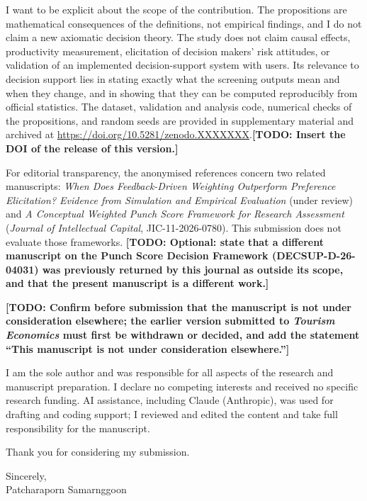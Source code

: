 \documentclass[11pt,a4paper]{article}
\newif\ifdraft \drafttrue
\newcommand{\todo}[1]{\ifdraft{\color{red}\textbf{[TODO: #1]}}\fi}
\newcommand{\RepoDOI}{10.5281/zenodo.XXXXXXX}
\begin{document}
I want to be explicit about the scope of the contribution. The propositions are mathematical consequences of the definitions, not empirical findings, and I do not claim a new axiomatic decision theory. The study does not claim causal effects, productivity measurement, elicitation of decision makers' risk attitudes, or validation of an implemented decision-support system with users. Its relevance to decision support lies in stating exactly what the screening outputs mean and when they change, and in showing that they can be computed reproducibly from official statistics. The dataset, validation and analysis code, numerical checks of the propositions, and random seeds are provided in supplementary material and archived at \url{https://doi.org/\RepoDOI}.\todo{Insert the DOI of the release of this version.}

For editorial transparency, the anonymised references concern two related manuscripts: \emph{When Does Feedback-Driven Weighting Outperform Preference Elicitation? Evidence from Simulation and Empirical Evaluation} (under review) and \emph{A Conceptual Weighted Punch Score Framework for Research Assessment} (\emph{Journal of Intellectual Capital}, JIC-11-2026-0780). This submission does not evaluate those frameworks. \todo{Optional: state that a different manuscript on the Punch Score Decision Framework (DECSUP-D-26-04031) was previously returned by this journal as outside its scope, and that the present manuscript is a different work.}

\todo{Confirm before submission that the manuscript is not under consideration elsewhere; the earlier version submitted to \emph{Tourism Economics} must first be withdrawn or decided, and add the statement ``This manuscript is not under consideration elsewhere.''}

I am the sole author and was responsible for all aspects of the research and manuscript preparation. I declare no competing interests and received no specific research funding. AI assistance, including Claude (Anthropic), was used for drafting and coding support; I reviewed and edited the content and take full responsibility for the manuscript.

Thank you for considering my submission.

Sincerely,\\Patcharaporn Samarnggoon
\end{document}
